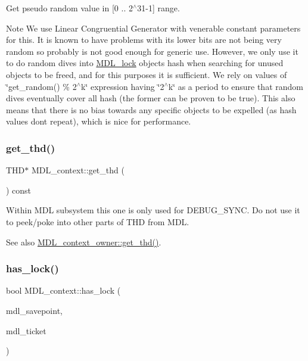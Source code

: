 Get pseudo random value in \mbox{[}0 .. 2$^\wedge$31-\/1\mbox{]} range.

\begin{DoxyNote}{Note}
We use Linear Congruential Generator with venerable constant parameters for this. It is known to have problems with its lower bits are not being very random so probably is not good enough for generic use. However, we only use it to do random dives into \mbox{\hyperlink{classMDL__lock}{M\+D\+L\+\_\+lock}} objects hash when searching for unused objects to be freed, and for this purposes it is sufficient. We rely on values of \char`\"{}get\+\_\+random() \% 2$^\wedge$k\char`\"{} expression having \char`\"{}2$^\wedge$k\char`\"{} as a period to ensure that random dives eventually cover all hash (the former can be proven to be true). This also means that there is no bias towards any specific objects to be expelled (as hash values don\textquotesingle{}t repeat), which is nice for performance. 
\end{DoxyNote}
\mbox{\label{classMDL__context_a2260019c16977e8ed6aba3081f16348f}} 
\subsubsection{\texorpdfstring{get\+\_\+thd()}{get\_thd()}}
{\footnotesize\ttfamily T\+HD$\ast$ M\+D\+L\+\_\+context\+::get\+\_\+thd (\begin{DoxyParamCaption}{ }\end{DoxyParamCaption}) const\hspace{0.3cm}{\ttfamily [inline]}}

Within M\+DL subsystem this one is only used for D\+E\+B\+U\+G\+\_\+\+S\+Y\+NC. Do not use it to peek/poke into other parts of T\+HD from M\+DL. \begin{DoxySeeAlso}{See also}
\mbox{\hyperlink{classMDL__context__owner_a6e93b957e332a9811d4a2d4195bd3e21}{M\+D\+L\+\_\+context\+\_\+owner\+::get\+\_\+thd()}}. 
\end{DoxySeeAlso}
\mbox{\label{classMDL__context_adfc9db02d0a60b144fd35770424ba1ae}} 
\subsubsection{\texorpdfstring{has\+\_\+lock()}{has\_lock()}}
{\footnotesize\ttfamily bool M\+D\+L\+\_\+context\+::has\+\_\+lock (\begin{DoxyParamCaption}\item[{const \mbox{\hyperlink{classMDL__savepoint}{M\+D\+L\+\_\+savepoint}} \&}]{mdl\+\_\+savepoint,  }\item[{\mbox{\hyperlink{classMDL__ticket}{M\+D\+L\+\_\+ticket}} $\ast$}]{mdl\+\_\+ticket }\end{DoxyParamCaption})}

